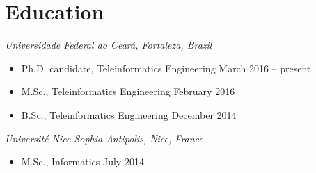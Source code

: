 \section{Education}

{\sl Universidade Federal do Ceará, Fortaleza, Brazil}
\begin{itemize}
	\item[] Ph.D. candidate, Teleinformatics Engineering \hfill March 2016 -- present
	\item[] M.Sc., Teleinformatics Engineering \hfill February 2016
	\item[] B.Sc., Teleinformatics Engineering \hfill December 2014
\end{itemize}

{\sl Université Nice-Sophia Antipolis, Nice, France}
\begin{itemize}
	\item[] M.Sc., Informatics \hfill July 2014
\end{itemize}